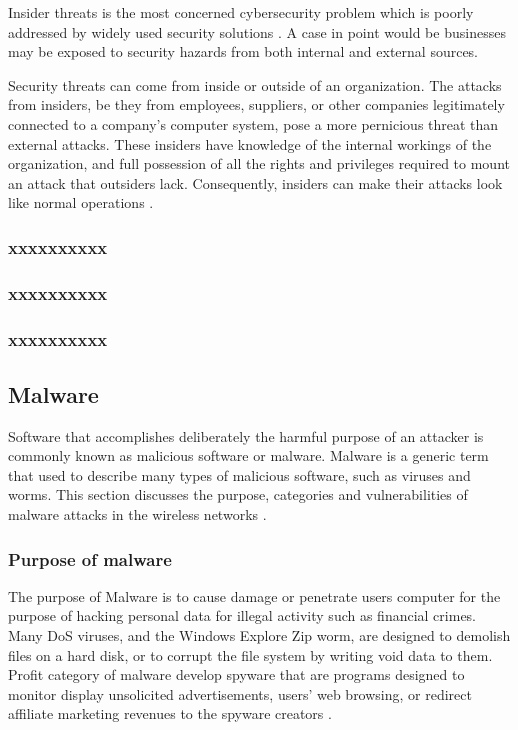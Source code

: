 \documentclass[twocolumn]{article}
\begin{document}
Insider threats is the most concerned cybersecurity
problem which is poorly addressed by widely used security
solutions \cite{singh2022systematic}. A case in point would be businesses may be exposed to security hazards from both internal and external sources.

Security threats can come from inside or outside of an organization. The attacks from insiders, be they from employees, suppliers, or other companies legitimately connected to a company’s computer system, pose a more pernicious threat than external attacks. These insiders have knowledge of the internal workings of the organization, and full
possession of all the rights and privileges required to mount an attack that outsiders lack. Consequently, insiders can make their attacks look like normal operations \cite{gheyas2016detection}.


\subsubsection{xxxxxxxxxx}
\subsubsection{xxxxxxxxxx}
\subsubsection{xxxxxxxxxx}
\subsection{Malware}
Software that accomplishes deliberately the harmful purpose of an attacker is commonly known as malicious software or malware. Malware is a generic term that
used to describe many types of malicious software, such as viruses and worms.
This section discusses the purpose, categories and vulnerabilities of malware attacks in the wireless networks \cite{divya2013survey}.
\subsubsection{Purpose of malware}
The purpose of Malware is to cause damage or penetrate users computer for the purpose of hacking personal data for illegal activity such as financial crimes. Many DoS viruses, and the
Windows Explore Zip worm, are designed to demolish files on a hard disk, or to corrupt the file system by writing void data to them. Profit category of malware develop spyware that are programs designed to monitor display unsolicited advertisements, users' web browsing, or
redirect affiliate marketing revenues to the spyware creators \cite{divya2013survey}.
\end{document}
